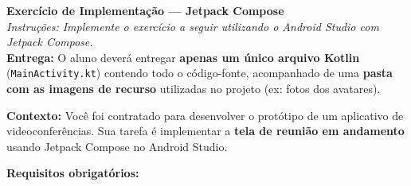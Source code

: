 \documentclass[12pt]{article}
\begin{document}

\vspace*{0.2cm}

\begin{center}
  {\Large \textbf{Exercício de Implementação --- Jetpack Compose}}\\[0.2cm]
  \textit{Instruções: Implemente o exercício a seguir utilizando o Android Studio com Jetpack Compose.}\\[0.15cm]
  \textbf{Entrega:} O aluno deverá entregar \textbf{apenas um único arquivo Kotlin} (\texttt{MainActivity.kt})
  contendo todo o código-fonte, acompanhado de uma \textbf{pasta com as imagens de recurso} utilizadas no projeto (ex: fotos dos avatares).
\end{center}

\vspace{0.4cm}

\textbf{Contexto:} Você foi contratado para desenvolver o protótipo de um aplicativo de videoconferências.
Sua tarefa é implementar a \textbf{tela de reunião em andamento} usando Jetpack Compose no Android Studio.

\vspace{0.3cm}
\textbf{Requisitos obrigatórios:}
\end{document}
